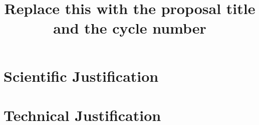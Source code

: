 \documentclass[11pt,a4paper,twoside]{article}
\title{Replace this with the proposal title and the cycle number}
\author{}
\date{}
\begin{document}
    \maketitle

    \section*{Scientific Justification}



    \section*{Technical Justification}



    
    
\end{document}
